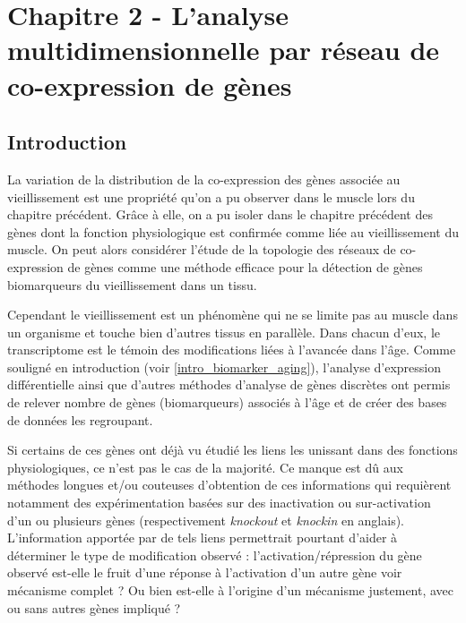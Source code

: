 \chapter{Chapitre 2 - L'analyse multidimensionnelle par réseau de co-expression de gènes}
\label{chapter:multidim}

\section{Introduction}

La variation de la distribution de la co-expression des gènes associée au vieillissement est une propriété qu'on a pu observer dans le muscle lors du chapitre précédent. Grâce à elle, on a pu isoler dans le chapitre précédent des gènes dont la fonction physiologique est confirmée comme liée au vieillissement du muscle. On peut alors considérer l'étude de la topologie des réseaux de co-expression de gènes comme une méthode efficace pour la détection de gènes biomarqueurs du vieillissement dans un tissu. 

Cependant le vieillissement est un phénomène qui ne se limite pas au muscle dans un organisme et touche bien d'autres tissus en parallèle. Dans chacun d'eux, le transcriptome est le témoin des modifications liées à l'avancée dans l'âge. Comme souligné en introduction (voir \ref{intro_biomarker_aging}), l'analyse d'expression différentielle ainsi que d'autres méthodes d'analyse de gènes discrètes \cite{Barabasi2004} ont permis de relever nombre de gènes (biomarqueurs) associés à l'âge et de créer des bases de données les regroupant. 

Si certains de ces gènes ont déjà vu étudié les liens les unissant dans des fonctions physiologiques, ce n'est pas le cas de la majorité. Ce manque est dû aux méthodes longues et/ou couteuses d'obtention de ces informations qui requièrent notamment des expérimentation basées sur des inactivation ou sur-activation  d'un ou plusieurs gènes (respectivement \textit{knockout} et \textit{knockin} en anglais). 
L'information apportée par de tels liens permettrait pourtant d'aider à déterminer le type de modification observé \cite{Lopez-Otin2013} : l'activation/répression du gène observé est-elle le fruit d'une réponse à l'activation d'un autre gène voir mécanisme complet ? Ou bien est-elle à l'origine d'un mécanisme justement, avec ou sans autres gènes impliqué ? 

